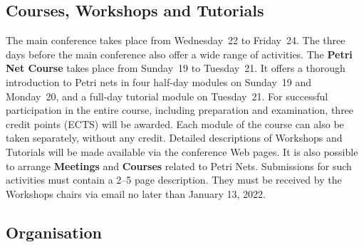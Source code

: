 \documentclass[10pt]{article}
\begin{document}
\subsection*{Courses, Workshops and Tutorials}
\vspace*{-0.5em}
The main conference takes place from Wednesday~22 to Friday~24.
The three days before the main conference also offer a wide range of activities.
The {\bf Petri Net Course}
takes place from Sunday~19 to Tuesday~21.
It offers a thorough introduction to Petri nets in
four half-day modules on Sunday~19 and Monday~20, and a full-day tutorial module on Tuesday~21.
For successful participation in the entire course, including preparation and examination,
three credit points (ECTS) will be awarded. Each module of the course can also be
taken separately, without any credit.
Detailed descriptions of Workshops and Tutorials will be made available via the conference
Web pages. It is also possible to arrange {\bf Meetings} and {\bf Courses} related to Petri Nets.
Submissions for such activities must contain a 2--5 page description. They must be
received by the Workshops chairs via email no later than January 13,
2022.

\subsection*{Organisation}
\vspace*{-1.5em}
\end{document}
